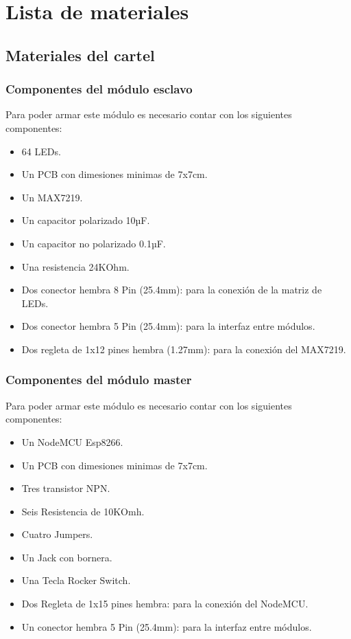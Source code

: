 \section{Lista de materiales}\label{sec:materiales}

\subsection{Materiales del cartel}

\subsubsection{Componentes del módulo esclavo}
Para poder armar este módulo es necesario contar con los siguientes componentes:
\begin{itemize}
    \item 64 LEDs.
    \item Un PCB con dimesiones minimas de 7x7cm.
    \item Un MAX7219.
    \item Un capacitor polarizado 10µF.
    \item Un capacitor no polarizado 0.1µF.
    \item Una resistencia 24KOhm.
    \item Dos conector hembra 8 Pin (25.4mm): para la conexión de la matriz de LEDs.
    \item Dos conector hembra 5 Pin (25.4mm): para la interfaz entre módulos.
    \item Dos regleta de 1x12 pines hembra (1.27mm): para la conexión del MAX7219.
\end{itemize}    

\subsubsection{Componentes del módulo master}
Para poder armar este módulo es necesario contar con los siguientes componentes:
\begin{itemize}
    \item Un NodeMCU Esp8266.
    \item Un PCB con dimesiones minimas de 7x7cm.
    \item Tres transistor NPN.
    \item Seis Resistencia de 10KOmh.
    \item Cuatro Jumpers.
    \item Un Jack con bornera.
    \item Una Tecla Rocker Switch.
    \item Dos Regleta de 1x15 pines hembra: para la conexión del NodeMCU.
    \item Un conector hembra 5 Pin (25.4mm): para la interfaz entre módulos.
\end{itemize}

